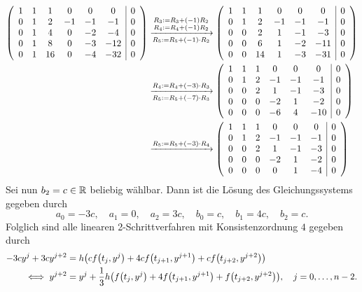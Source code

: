\documentclass{exercise}
\begin{document}
	\begin{align*}
		\parentheses*{\begin{array}{cccccc|c}
			1 & 1 & 1 & 0 & 0 & 0 & 0\\
			0 & 1 & 2 & -1 & -1 & -1 & 0\\
			0 & 1 & 4 & 0 & -2 & -4 & 0\\
			0 & 1 & 8 & 0 & -3 & -12 & 0\\
			0 & 1 & 16 & 0 & -4 & -32 & 0
		\end{array}} &\xrightarrow[R_5 := R_5 + \parentheses*{-1} \cdot R_2]{\substack{R_3 := R_3 + \parentheses*{-1}R_2\\R_4 := R_4 + \parentheses*{-1}R_2}} \parentheses*{\begin{array}{cccccc|c}
			1 & 1 & 1 & 0 & 0 & 0 & 0\\
			0 & 1 & 2 & -1 & -1 & -1 & 0\\
			0 & 0 & 2 & 1 & -1 & -3 & 0\\
			0 & 0 & 6 & 1 & -2 & -11 & 0\\
			0 & 0 & 14 & 1 & -3 & -31 & 0
		\end{array}}\\
		&\xrightarrow[R_5 := R_5 + \parentheses*{-7} \cdot R_3]{R_4 := R_4 + \parentheses*{-3} \cdot R_3} \parentheses*{\begin{array}{cccccc|c}
			1 & 1 & 1 & 0 & 0 & 0 & 0\\
			0 & 1 & 2 & -1 & -1 & -1 & 0\\
			0 & 0 & 2 & 1 & -1 & -3 & 0\\
			0 & 0 & 0 & -2 & 1 & -2 & 0\\
			0 & 0 & 0 & -6 & 4 & -10 & 0
		\end{array}}\\
		&\xrightarrow{R_5 := R_5 + \parentheses*{-3} \cdot R_4} \parentheses*{\begin{array}{cccccc|c}
			1 & 1 & 1 & 0 & 0 & 0 & 0\\
			0 & 1 & 2 & -1 & -1 & -1 & 0\\
			0 & 0 & 2 & 1 & -1 & -3 & 0\\
			0 & 0 & 0 & -2 & 1 & -2 & 0\\
			0 & 0 & 0 & 0 & 1 & -4 & 0
		\end{array}}
	\end{align*}
	Sei nun \(b_2 = c \in \R\) beliebig wählbar. Dann ist die Lösung des Gleichungssystems gegeben durch
	\[
		a_0 = -3c, \quad a_1 = 0, \quad a_2 = 3c, \quad b_0 = c, \quad b_1 = 4c, \quad b_2 = c.
	\]
	Folglich sind alle linearen 2-Schrittverfahren mit Konsistenzordnung \(4\) gegeben durch
	\begin{align*}
		-3cy^j + 3cy^{j + 2} &= h\parentheses*{cf\parentheses*{t_j, y^j} + 4cf\parentheses*{t_{j + 1},y^{j + 1}} + cf\parentheses*{t_{j + 2}, y^{j + 2}}}\\
		\iff y^{j + 2} &= y^j + \frac{1}{3}h\parentheses*{f\parentheses*{t_j, y^j} + 4f\parentheses*{t_{j + 1},y^{j + 1}} + f\parentheses*{t_{j + 2}, y^{j + 2}}}, \quad j = 0, \ldots, n - 2.
	\end{align*}
\end{document}
